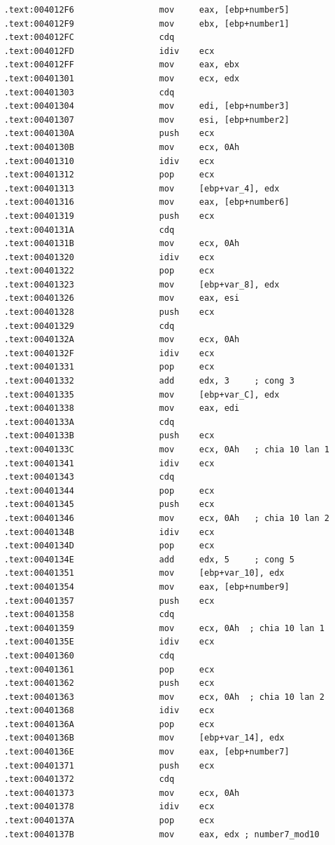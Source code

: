 \begin{lstlisting}
	.text:004012F6                 mov     eax, [ebp+number5]
	.text:004012F9                 mov     ebx, [ebp+number1]
	.text:004012FC                 cdq
	.text:004012FD                 idiv    ecx
	.text:004012FF                 mov     eax, ebx
	.text:00401301                 mov     ecx, edx
	.text:00401303                 cdq
	.text:00401304                 mov     edi, [ebp+number3]
	.text:00401307                 mov     esi, [ebp+number2]
	.text:0040130A                 push    ecx
	.text:0040130B                 mov     ecx, 0Ah
	.text:00401310                 idiv    ecx
	.text:00401312                 pop     ecx
	.text:00401313                 mov     [ebp+var_4], edx
	.text:00401316                 mov     eax, [ebp+number6]
	.text:00401319                 push    ecx
	.text:0040131A                 cdq
	.text:0040131B                 mov     ecx, 0Ah
	.text:00401320                 idiv    ecx
	.text:00401322                 pop     ecx
	.text:00401323                 mov     [ebp+var_8], edx
	.text:00401326                 mov     eax, esi
	.text:00401328                 push    ecx
	.text:00401329                 cdq
	.text:0040132A                 mov     ecx, 0Ah
	.text:0040132F                 idiv    ecx
	.text:00401331                 pop     ecx
	.text:00401332                 add     edx, 3     ; cong 3
	.text:00401335                 mov     [ebp+var_C], edx
	.text:00401338                 mov     eax, edi
	.text:0040133A                 cdq
	.text:0040133B                 push    ecx
	.text:0040133C                 mov     ecx, 0Ah   ; chia 10 lan 1
	.text:00401341                 idiv    ecx
	.text:00401343                 cdq
	.text:00401344                 pop     ecx
	.text:00401345                 push    ecx
	.text:00401346                 mov     ecx, 0Ah   ; chia 10 lan 2
	.text:0040134B                 idiv    ecx
	.text:0040134D                 pop     ecx
	.text:0040134E                 add     edx, 5     ; cong 5
	.text:00401351                 mov     [ebp+var_10], edx
	.text:00401354                 mov     eax, [ebp+number9]
	.text:00401357                 push    ecx
	.text:00401358                 cdq
	.text:00401359                 mov     ecx, 0Ah  ; chia 10 lan 1
	.text:0040135E                 idiv    ecx
	.text:00401360                 cdq
	.text:00401361                 pop     ecx
	.text:00401362                 push    ecx
	.text:00401363                 mov     ecx, 0Ah  ; chia 10 lan 2
	.text:00401368                 idiv    ecx
	.text:0040136A                 pop     ecx
	.text:0040136B                 mov     [ebp+var_14], edx
	.text:0040136E                 mov     eax, [ebp+number7]
	.text:00401371                 push    ecx
	.text:00401372                 cdq
	.text:00401373                 mov     ecx, 0Ah
	.text:00401378                 idiv    ecx
	.text:0040137A                 pop     ecx
	.text:0040137B                 mov     eax, edx ; number7_mod10
\end{lstlisting}

